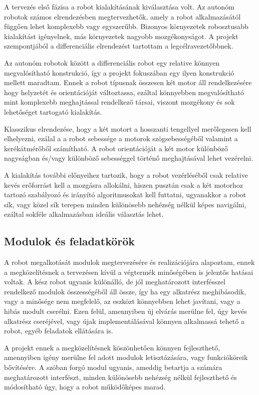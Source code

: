A tervezés első fázisa a robot kialakításának kiválasztása volt. Az autonóm
robotok számos elrendezésben megtervezhetők, amely a robot alkalmazásától függően
lehet komplexebb vagy egyszerűbb. Bizonyos környezetek robosztusabb kialakítást
igényelnek, más környezetek nagyobb mozgékonyságot. A projekt szempontjából a
differenciális elrendezést tartottam a legcélravezetőbbnek.

Az autonóm robotok között a differenciális robot egy relative könnyen
megvalósítható konstrukció, így a projekt fokuszában egy ilyen konstrukció
mellett maradtam. Ennek a robot típusnak összesen két motor áll rendelkezésére
hogy helyzetét és orientációját változtassa, ezáltal könnyebben megvalósítható
mint komplexebb meghajtással rendelkező társai, viszont mozgékony és sok
lehetőséget tartogató kialakítás.


Klasszikus elrendezése, hogy a két motort a hosszanti tengellyel merőlegesen kell
elhelyezni, ezálal a a robot sebessége a motorok szögsebességéből valamint a
kerékátmérőből számítható. A robot orientációját a két motor különböző nagyságban
és/vagy különböző sebességgel történő meghajtásával lehet vezérelni.

A kialakítás további előnyeihez tartozik, hogy a robot vezérléséből csak relative
kevés erőforrást kell a mozgásra allokálni, hiszen pusztán csak a két motorhoz
tartozó szabályozó és irányító algoritmusokat kell futtatni, ugyanakkor a robot
sík, vagy közel sík terepen minden különösebb nehézség nélkül képes navigálni,
ezáltal sokféle alkalmazásban ideális választás lehet.

\subsection{Modulok és feladatkörök}

A robot megalkotását modulok megtervezésére és realizációjára alapoztam, ennek a
megközelítésnek a tervezésen kívül a végtermék minőségében is jelentős hatásai
voltak. A kész robot ugyanis különálló, de jól meghatározott interfésszel
rendelkező modulok összességéből áll össze, így ha egy alkatrész meghibásodik,
vagy a minősége nem megfelelő, az eszközt könnyebben lehet javítani, vagy a hibás
modult cserélni. Ezen felül, amennyiben új elvárás merülne fel, úgy kevés
alkatrész cseréjével, vagy újak implementálásával könnyen alkalmassá tehető a
robot, egyéb feladatok ellátására is.

A projekt ennek a megközelítésnek köszönhetően könnyen fejleszthető, amennyiben
igény merülne fel adott modulok letisztázására, vagy funkcióköreik bővítésére. A
szóban forgó modul ugyanis, ameddig betartja a számára meghatározott interfészt,
minden különösebb nehézség nélkül fejleszthető és módosítható úgy, hogy a robot
működőképes marad.

